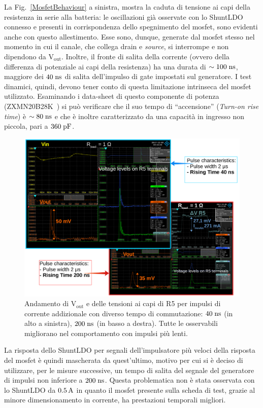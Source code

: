 La Fig.~\ref{MosfetBehaviour} a sinistra, mostra la caduta di tensione ai capi della resistenza in serie alla batteria: le oscillazioni già osservate con lo ShuntLDO connesso e presenti in corrispondenza dello spegnimento del mosfet, sono evidenti anche con questo allestimento.
Esse sono, dunque, generate dal mosfet stesso nel momento in cui il canale, che collega drain e \textit{source}, si interrompe e non dipendono da $\mathrm{V_{out}}$.
Inoltre, il fronte di salita della corrente (ovvero della differenza di potenziale ai capi della resistenza) ha una durata di $\sim 100 \rm \; ns$, maggiore dei $40\rm \; ns$ di salita dell'impulso di gate impostati sul generatore. I test dinamici, quindi, devono tener conto di questa limitazione intrinseca del mosfet utilizzato. Esaminando i data-sheet di questo componente di potenza (ZXMN20B28K~\cite{MOSFET}) si può verificare che il suo tempo di ``accensione'' (\textit{Turn-on rise time}) è $\sim 80 \rm \; ns$ e che \`e inoltre caratterizzato da una capacità in ingresso non piccola, pari a $360\rm \; pF$.
\begin{figure}
\centering
\includegraphics[width=\linewidth]{Immagini/RiseTime}
\caption{Andamento di $\mathrm{V_{out}}$ e delle tensioni ai capi di R5 per impulsi di corrente addizionale con diverso tempo di commutazione: $40\rm \; ns$ (in alto a sinistra), $200\rm \; ns$ (in basso a destra). Tutte le osservabili migliorano nel comportamento con impulsi pi\`u lenti.}
\label{RiseTime}
\end{figure}

La risposta dello ShuntLDO per segnali dell'impulsatore più veloci della risposta del mosfet è quindi mascherata da quest'ultimo, motivo per cui si è deciso di utilizzare, per le misure successive, un tempo di salita del segnale del generatore di impulsi non inferiore a $200\rm \; ns$. Questa problematica non \`e stata osservata con lo ShuntLDO da $0.5\rm \, A$ in quanto il mosfet presente sulla scheda di test, grazie al minore dimensionamento in corrente, ha prestazioni temporali migliori.


